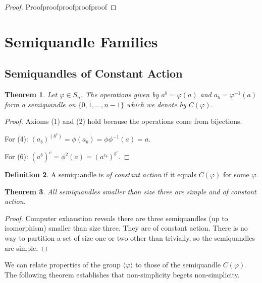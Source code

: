 \documentclass{amsart}
\newtheorem{thm}{Theorem}[section]
\theoremstyle{definition}
\newtheorem{definition}[thm]{Definition}
\numberwithin{equation}{section}
\begin{document}
\begin{proof}
Proofproofproofproofproof
\end{proof}


\section{Semiquandle Families}

\subsection{Semiquandles of Constant Action}

\begin{thm}
Let $\varphi \in S_n$. The operations given by $a^{b} = \varphi(a)$
and $a_b = \varphi^{-1}(a)$ form a semiquandle on $\{0, 1, \ldots,
n-1\}$ which we denote by $C(\varphi)$.
\end{thm}

\begin{proof}
  Axioms (1) and (2) hold because the operations come from bijections.

For (4): $(a_b)^{(b^a)} = \phi(a_b) = \phi \phi^{-1}(a) = a$.

For (6): $(a^b)^c = \phi^{2}(a) = (a^{c_b})^{b^c}$.

\end{proof}

\begin{definition}
A semiquandle is \emph{of constant action} if it equals $C(\varphi)$ for some $\varphi$.
\end{definition}

\begin{thm}
All semiquandles smaller than size three are simple and of constant action.
\end{thm}

\begin{proof}
Computer exhaustion reveals there are three semiquandles (up to isomorphism) smaller than
size three. They are of constant action. There is no way to partition a set of size one or two
other than trivially, so the semiquandles are simple.
\end{proof}

We can relate properties of the group $\langle\varphi\rangle$ to those of the semiquandle $C(\varphi)$.
The following theorem establishes that non-simplicity begets non-simplicity.
\end{document}
